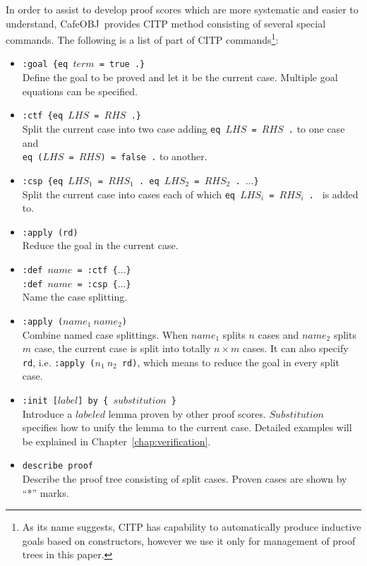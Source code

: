 \documentclass[12pt]{report}
\newcommand{\stt}[1]{{\small{\tt {#1}}}}
\newcommand{\cafeobj}{{\sf CafeOBJ}~}
\begin{document}
In order to assist to develop proof scores which are more systematic
and easier to understand, \cafeobj provides CITP method consisting of
several special commands. The following is a list of part of CITP
commands\footnote{As its name suggests, CITP has capability to
  automatically produce inductive goals based on constructors, however
  we use it only for management of proof trees in this paper.}:
\begin{itemize}
\item \stt{:goal \{eq $term$ = true .\}}\\ Define the goal to be
  proved and let it be the current case. Multiple goal equations
  can be specified.
\item \stt{:ctf \{eq $LHS$ = $RHS$ .\}}\\
  Split the current case into two case adding \stt{eq~$LHS$~=~$RHS$~.} to one case and\\
  \stt{eq~($LHS$~=~$RHS$)~=~false~.} to another.
\item \stt{:csp \{eq $LHS_1$ = $RHS_1$ . eq $LHS_2$ = $RHS_2$ . $\dots$\}}\\
  Split the current case into cases each of which
  \stt{eq~$LHS_i$~=~$RHS_i$~.~} is added to.
\item \stt{:apply (rd)}\\
 Reduce the goal in the current case.
\item \stt{:def $name$ = :ctf \{$\dots$\}}\\
  \stt{:def $name$ = :csp \{$\dots$\}}\\
  Name the case splitting.
\item \stt{:apply ($name_1\ name_2$)}\\ Combine named case
  splittings. When $name_1$ splits $n$ cases and $name_2$ splits $m$
  case, the current case is split into totally $n\times m$ cases.  It
  can also specify {\tt rd}, i.e. \stt{:apply~($n_1\ n_2$~rd)}, which
    means to reduce the goal in every split case.
\item \stt{:init [$label$] by \{ $substitution$ \}}\\
  Introduce a $labeled$ lemma proven by other proof scores. $Substitution$ specifies
  how to unify the lemma to the current case. Detailed examples will be explained
  in Chapter~\ref{chap:verification}.
\item \stt{describe proof}\\
 Describe the proof tree consisting of split cases. Proven cases are shown by ``*'' marks.
\end{itemize}
\end{document}
